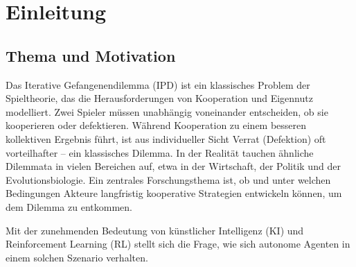 \chapter{Einleitung}

\section{Thema und Motivation}
Das Iterative Gefangenendilemma (IPD) ist ein klassisches Problem der Spieltheorie, 
das die Herausforderungen von Kooperation und Eigennutz modelliert. 
Zwei Spieler müssen unabhängig voneinander entscheiden, ob sie kooperieren oder 
defektieren. Während Kooperation zu einem besseren kollektiven Ergebnis führt, 
ist aus individueller Sicht Verrat (Defektion) oft vorteilhafter -- ein klassisches Dilemma.
In der Realität tauchen ähnliche Dilemmata in vielen Bereichen auf, etwa in der 
Wirtschaft, der Politik und der Evolutionsbiologie. Ein zentrales Forschungsthema 
ist, ob und unter welchen Bedingungen Akteure langfristig kooperative Strategien 
entwickeln können, um dem Dilemma zu entkommen.

Mit der zunehmenden Bedeutung von künstlicher Intelligenz (KI) und Reinforcement 
Learning (RL) stellt sich die Frage, wie sich autonome Agenten in einem solchen 
Szenario verhalten. 

